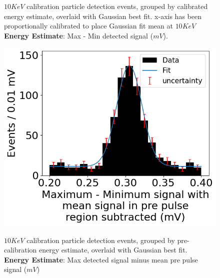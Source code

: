 \begin{figure}[H]
\begin{minipage}[t]{0.45\linewidth}
\begin{center}
			\caption{
                $10\unit{KeV}$ calibration particle detection events, grouped by calibrated energy estimate, overlaid with Gaussian best fit. x-axis has been proportionally calibrated to place Gaussian fit mean at $10\unit{KeV}$ \\
                \textbf{Energy Estimate}: Max - Min detected signal ($\unit{mV}$).
            }
		\end{center}
	\end{minipage}
\end{figure}

\begin{figure}[H]
	\begin{minipage}[t]{0.45\linewidth}
		\begin{center}
            \label{fig::amp2}
			\includegraphics[width=\textwidth]{figures/amp2.png}
			\caption{
                $10\unit{KeV}$ calibration particle detection events, grouped by pre-calibration energy estimate, overlaid with Gaussian best fit.\\
                \textbf{Energy Estimate}: Max detected signal minus mean pre pulse signal  ($\unit{mV}$)
            }
		\end{center}
	\end{minipage}
    \hfill
	\begin{minipage}[t]{0.45\linewidth}
		\begin{center}
            \label{fig::amp2--cal}

\end{center}
\end{minipage}
\end{figure}
